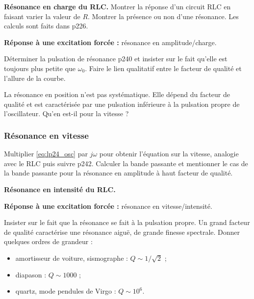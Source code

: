 \begin{experience}
\textbf{Résonance en charge du RLC.}
Montrer la réponse d'un circuit RLC en faisant varier la valeur de $R$. Montrer la présence ou non d'une résonance.
Les calculs sont faits dans \cite{Michel2017} p226.
\end{experience}

\begin{slide}
\textbf{Réponse à une excitation forcée :} résonance en amplitude/charge.
\end{slide}

Déterminer la pulsation de résonance \cite{Michel2017} p240 et insister sur le fait qu'elle est toujours plus petite que $\omega_0$.
Faire le lien qualitatif entre le facteur de qualité et l'allure de la courbe.

\begin{transition}
La résonance en position n'est pas systématique.
Elle dépend du facteur de qualité et est caractérisée par une pulsation inférieure à la pulsation propre de l'oscillateur.
Qu'en est-il pour la vitesse ?
\end{transition}

\subsubsection{Résonance en vitesse}

Multiplier \eqref{eq:lp24_osc} par $j\omega$ pour obtenir l'équation sur la vitesse, analogie avec le RLC puis suivre \cite{Michel2017} p242.
Calculer la bande passante et mentionner le cas de la bande passante pour la résonance en amplitude à haut facteur de qualité.

\begin{experience}
\textbf{Résonance en intensité du RLC.}
\end{experience}

\begin{slide}
\textbf{Réponse à une excitation forcée :} résonance en vitesse/intensité.
\end{slide}

Insister sur le fait que la résonance se fait à la pulsation propre.
Un grand facteur de qualité caractérise une résonance aiguë, de grande finesse spectrale.
Donner quelques ordres de grandeur :
\begin{itemize}
\item amortisseur de voiture, sismographe : $Q \sim 1/\sqrt{2}$ ;
\item diapason : $Q \sim 1000$ ;
\item quartz, mode pendules de Virgo : $Q \sim 10^6$.
\end{itemize}

